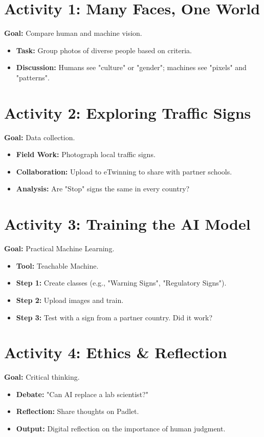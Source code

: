 \documentclass[11pt, a4paper]{article}
\begin{document}
\section{Activity 1: Many Faces, One World}
\textbf{Goal:} Compare human and machine vision.
\begin{itemize}
    \item \textbf{Task:} Group photos of diverse people based on criteria.
    \item \textbf{Discussion:} Humans see "culture" or "gender"; machines see "pixels" and "patterns".
\end{itemize}

\section{Activity 2: Exploring Traffic Signs}
\textbf{Goal:} Data collection.
\begin{itemize}
    \item \textbf{Field Work:} Photograph local traffic signs.
    \item \textbf{Collaboration:} Upload to eTwinning to share with partner schools.
    \item \textbf{Analysis:} Are "Stop" signs the same in every country?
\end{itemize}

\section{Activity 3: Training the AI Model}
\textbf{Goal:} Practical Machine Learning.
\begin{itemize}
    \item \textbf{Tool:} Teachable Machine.
    \item \textbf{Step 1:} Create classes (e.g., "Warning Signs", "Regulatory Signs").
    \item \textbf{Step 2:} Upload images and train.
    \item \textbf{Step 3:} Test with a sign from a partner country. Did it work?
\end{itemize}

\section{Activity 4: Ethics \& Reflection}
\textbf{Goal:} Critical thinking.
\begin{itemize}
    \item \textbf{Debate:} "Can AI replace a lab scientist?"
    \item \textbf{Reflection:} Share thoughts on Padlet.
    \item \textbf{Output:} Digital reflection on the importance of human judgment.
\end{itemize}
\end{document}
